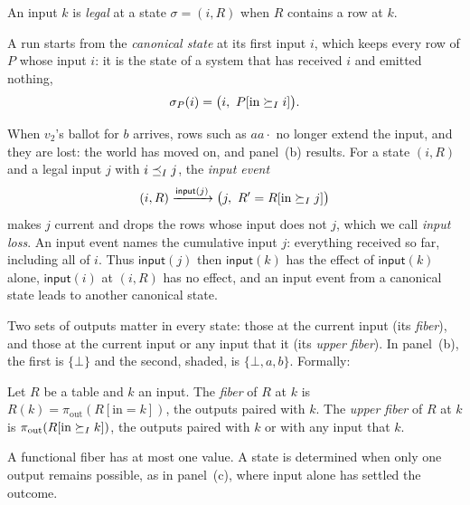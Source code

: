 \begin{definition}
\label{def:legal-input}
An input $k$ is \emph{legal} at a state $\sigma=(i,R)$ when $R$ contains a row at $k$.
\end{definition}

A run starts from the \emph{canonical state} at its first input $i$, which
keeps every row of $P$ whose input \inrel $i$: it is the state of a system that
has received $i$ and emitted nothing,
\begin{equation}
  \sigma_P(i)=\bigl(i,\ P[\mathrm{in}\InputGe i]\bigr).
  \label{eq:canonical-state}
\end{equation}

When $v_2$'s ballot for $b$ arrives, rows such as $aa\cdot$ no longer extend
the input, and they are lost: the world has moved on, and panel~(b) results.
For a state $(i,R)$ and a legal input $j$ with $i\preceq_I j$, the \emph{input
event}
\begin{equation}
  (i,R)\xrightarrow{\mathsf{input}(j)}
  \bigl(j,\ R' = R[\mathrm{in}\succeq_I j]\bigr)
  \label{eq:input-event}
\end{equation}
makes $j$ current and drops the rows whose input does not \inrelbase $j$,
which we call \emph{input loss}.  An input event names the cumulative input
$j$: everything received so far, including all of $i$.  Thus
$\mathsf{input}(j)$ then $\mathsf{input}(k)$ has the effect of
$\mathsf{input}(k)$ alone, $\mathsf{input}(i)$ at $(i,R)$ has no effect, and an
input event from a canonical state leads to another canonical state.

Two sets of outputs matter in every state: those at the current
input (its \emph{fiber}), and those at the current input or any input that
\inrel it (its \emph{upper fiber}).  In panel~(b), the
first is $\{\bot\}$ and the second, shaded, is $\{\bot,a,b\}$.  Formally:

\begin{definition}
\label{def:fiber}
Let $R$ be a table and $k$ an input.  The \emph{fiber} of $R$ at $k$ is
$R(k)=\pi_{\mathrm{out}}(R[\mathrm{in}=k])$, the outputs paired with $k$.  The
\emph{upper fiber} of $R$ at $k$ is $\pi_{\mathrm{out}}(R[\mathrm{in}\succeq_I
k])$, the outputs paired with $k$ or with any input that \inrel $k$.
\end{definition}

A functional fiber has at most one value.  A state is determined when only one
output remains possible, as in panel~(c), where input alone has settled the
outcome.

